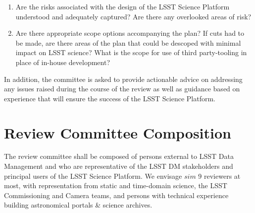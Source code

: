 \documentclass[DM,lsstdraft,STS,toc]{lsstdoc}
\begin{document}
\begin{enumerate}
\item Are the risks associated with the design of the LSST Science Platform understood and adequately captured? Are there any overlooked areas of risk?
%
\item Are there appropriate scope options accompanying the plan? 
If cuts had to be made, are there areas of the plan that could be descoped with minimal impact on LSST science?
What is the scope for use of third party-tooling in place of in-house development? 

\end{enumerate}

In addition, the committee is asked to provide actionable advice on addressing any issues raised during the course of the review as well as guidance based on experience that will ensure the success of the LSST Science Platform.

\section{Review Committee Composition}
The review committee shall be composed of persons external to LSST Data Management
and who are representative of the LSST DM stakeholders and principal users of the LSST Science Platform. 
We envisage $sim$ 9 reviewers at most, with representation from static and time-domain science, the LSST Commissioning and Camera teams,  
and persons with technical experience building astronomical portals \& science archives. 

\end{document}
